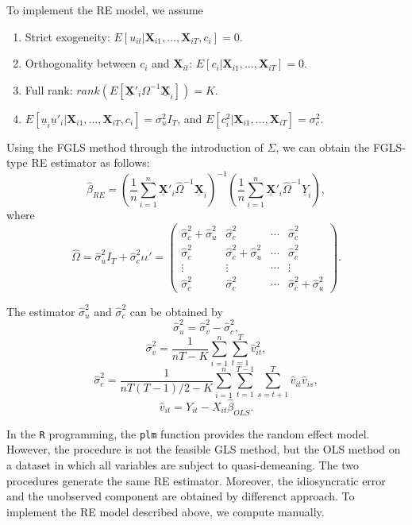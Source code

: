 \documentclass[
  12pt,
]{article}
\providecommand{\tightlist}{%
  \setlength{\itemsep}{0pt}\setlength{\parskip}{0pt}}
\begin{document}
To implement the RE model, we assume

\begin{enumerate}
\def\labelenumi{\arabic{enumi}.}
\tightlist
\item
  Strict exogeneity:
  \(E[u_{it} | \mathbf{X}_{i1}, \ldots, \mathbf{X}_{iT}, c_i] = 0\).
\item
  Orthogonality between \(c_i\) and \(\mathbf{X}_{it}\):
  \(E[c_i | \mathbf{X}_{i1}, \ldots, \mathbf{X}_{iT}] = 0\).
\item
  Full rank:
  \(rank(E[\underline{\mathbf{X}}'_i \Omega^{-1} \underline{\mathbf{X}}_i]) = K\).
\item
  \(E[\underline{u}_i\underline{u}'_i | \mathbf{X}_{i1}, \ldots, \mathbf{X}_{iT}, c_i] = \sigma_u^2 I_T\),
  and
  \(E[c_i^2 | \mathbf{X}_{i1}, \ldots, \mathbf{X}_{iT}] = \sigma_c^2\).
\end{enumerate}

Using the FGLS method through the introduction of \(\Sigma\), we can
obtain the FGLS-type RE estimator as follows: \[
  \hat{\beta}_{RE} = 
  \left( \frac{1}{n} \sum_{i=1}^n \underline{\mathbf{X}}'_i \hat{\Omega}^{-1} \underline{\mathbf{X}}_i \right)^{-1}
  \left( \frac{1}{n} \sum_{i=1}^n \underline{\mathbf{X}}'_i \hat{\Omega}^{-1} \underline{Y}_i \right),
\] where \[
  \hat{\Omega} = \hat{\sigma}_u^2 I_T + \hat{\sigma}_c^2 \iota \iota' =
  \begin{pmatrix}
    \hat{\sigma}_c^2 + \hat{\sigma}_u^2 & \hat{\sigma}_c^2 & \cdots & \hat{\sigma}_c^2 \\
    \hat{\sigma}_c^2 & \hat{\sigma}_c^2 + \hat{\sigma}_u^2 & \cdots & \hat{\sigma}_c^2 \\
    \vdots & \vdots & \cdots & \vdots \\
    \hat{\sigma}_c^2 & \hat{\sigma}_c^2 & \cdots & \hat{\sigma}_c^2 + \hat{\sigma}_u^2
  \end{pmatrix}.
\]

The estimator \(\hat{\sigma}_u^2\) and \(\hat{\sigma}_c^2\) can be
obtained by \[
  \hat{\sigma}_u^2 = \hat{\sigma}_v^2 - \hat{\sigma}_c^2,
\] \[
  \hat{\sigma}_v^2 = \frac{1}{nT - K} \sum_{i=1}^n \sum_{t=1}^T \hat{v}_{it}^2,
\] \[
  \hat{\sigma}_c^2 = 
  \frac{1}{nT(T-1)/2 - K} \sum_{i=1}^n \sum_{t=1}^{T-1} \sum_{s=t+1}^T \hat{v}_{it} \hat{v}_{is},
\] \[
  \hat{v}_{it} = Y_{it} - X_{it} \hat{\beta}_{OLS}.
\]

In the \texttt{R} programming, the \texttt{plm} function provides the
random effect model. However, the procedure is not the feasible GLS
method, but the OLS method on a dataset in which all variables are
subject to quasi-demeaning. The two procedures generate the same RE
estimator. Moreover, the idiosyncratic error and the unobserved
component are obtained by differenct approach. To implement the RE model
described above, we compute manually.
\end{document}
